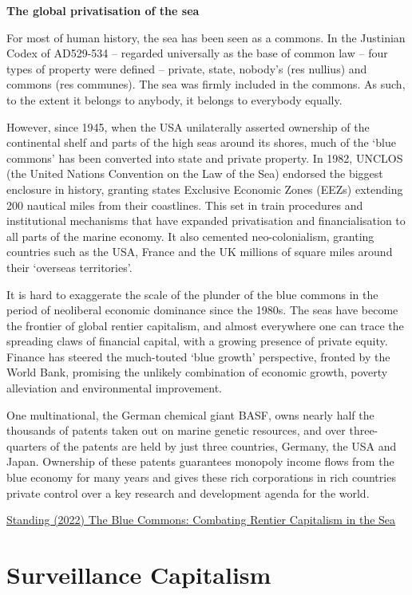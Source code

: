 \documentclass[
]{book}
\begin{document}
\textbf{The global privatisation of the sea}

For most of human history, the sea has been seen as a commons. In the Justinian Codex of AD529-534 -- regarded universally as the base of common law -- four types of property were defined -- private, state, nobody's (res nullius) and commons (res communes). The sea was firmly included in the commons. As such, to the extent it belongs to anybody, it belongs to everybody equally.

However, since 1945, when the USA unilaterally asserted ownership of the continental shelf and parts of the high seas around its shores, much of the `blue commons' has been converted into state and private property. In 1982, UNCLOS (the United Nations Convention on the Law of the Sea) endorsed the biggest enclosure in history, granting states Exclusive Economic Zones (EEZs) extending 200 nautical miles from their coastlines. This set in train procedures and institutional mechanisms that have expanded privatisation and financialisation to all parts of the marine economy. It also cemented neo-colonialism, granting countries such as the USA, France and the UK millions of square miles around their `overseas territories'.

It is hard to exaggerate the scale of the plunder of the blue commons in the period of neoliberal economic dominance since the 1980s. The seas have become the frontier of global rentier capitalism, and almost everywhere one can trace the spreading claws of financial capital, with a growing presence of private equity. Finance has steered the much-touted `blue growth' perspective, fronted by the World Bank, promising the unlikely combination of economic growth, poverty alleviation and environmental improvement.

One multinational, the German chemical giant BASF, owns nearly half the thousands of patents taken out on marine genetic resources, and over three-quarters of the patents are held by just three countries, Germany, the USA and Japan. Ownership of these patents guarantees monopoly income flows from the blue economy for many years and gives these rich corporations in rich countries private control over a key research and development agenda for the world.

\href{https://progressiveeconomyforum.com/blog/the-blue-commons-combating-rentier-capitalism-in-the-sea/}{Standing (2022) The Blue Commons: Combating Rentier Capitalism in the Sea}

\hypertarget{surveillance-capitalism}{%
\chapter{Surveillance Capitalism}\label{surveillance-capitalism}}
\end{document}
